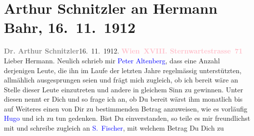 

               \section[Arthur Schnitzler an Hermann Bahr, 16. 11. 1912]{ Arthur Schnitzler an Hermann Bahr, 16. 11. 1912}\nopagebreak{}\rehead{ }\normalsize\beginnumbering{} \toendnotes[C]{\smallbreak\pagebreak[2]} 
\pstart
           \noindent{}{\pb}\textcolor{gray}{\textbf{Dr. Arthur Schnitzler}}\hfill 16. 11. 1912. \pend
           \pstart
           \textcolor{gray}{\textbf{\textcolor{pink}{Wien XVIII. Sternwartestrasse 71}{}\ledrightnote{\textcolor{pink}{Sternwartestraße}}}}\pend
           \pstart{}Lieber Hermann.\pend\pstart
           Neulich schrieb mir \textcolor{blue}{Peter Altenberg}{}\ledrightnote{\textcolor{blue}{Peter Altenberg}}, dass eine
               Anzahl derjenigen Leute, die ihn im Laufe der letzten Jahre regelmässig
               unterstützten, allmählich ausgesprungen seien und frägt mich zugleich, ob ich bereit
               wäre an Stelle dieser Leute einzutreten und andere in gleichem Sinn zu gewinnen.
               Unter diesen nennt er Dich und so frage ich an, ob Du bereit wärst ihm monatlich bis
               auf Weiteres einen von Dir zu bestimmenden Betrag anzuweisen, wie es vorläufig \textcolor{blue}{Hugo}{}\ledrightnote{\textcolor{blue}{Hugo von Hofmannsthal}} und ich zu tun gedenken. Bist Du
               einverstanden, so teile es mir freundlichst mit und schreibe zugleich an \textcolor{blue}{S. Fischer}{}\ledrightnote{\textcolor{blue}{Samuel Fischer}}, mit welchem Betrag Du Dich zu
